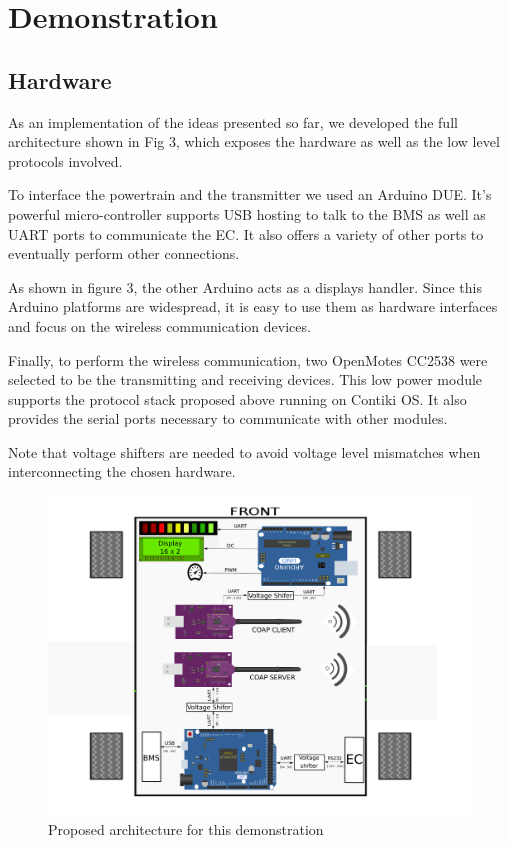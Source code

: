 \documentclass[runningheads]{llncs}
\begin{document}
\section{Demonstration}
\subsection{Hardware}


As an implementation of the ideas presented so far, we developed the
full architecture shown in Fig 3, which exposes the hardware as well as the low
level protocols involved.

To interface the powertrain and the transmitter we used an Arduino DUE. It's
powerful micro-controller supports USB hosting to talk to the BMS as well as
UART ports to communicate the EC. It also offers a variety of other ports to
eventually perform other connections.

As shown in figure 3, the other Arduino acts as a displays handler. Since this
Arduino platforms are  widespread, it is easy to use them as hardware interfaces
and focus on the wireless communication devices.
	
Finally, to perform the wireless communication, two OpenMotes CC2538 were
selected to be the transmitting and receiving devices. This low power module
supports the protocol stack proposed above running  on Contiki OS. It also
provides the serial ports necessary to communicate with other modules.

Note that voltage shifters are needed to avoid voltage level mismatches when
interconnecting the chosen hardware.

\begin{figure}[!h]
\includegraphics[width=\textwidth] {proposed_architecture_UNO.pdf}

\caption{Proposed architecture for this demonstration} \label{fig2}
\end{figure}
\end{document}
